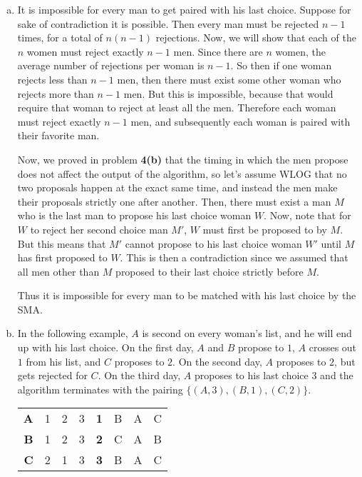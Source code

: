 \begin{enumerate}
\begin{enumerate}[(a)]
        \item It is impossible for every man to get paired with his last choice. Suppose for sake of contradiction it is possible. Then every man must be rejected $n-1$ times, for a total of $n(n-1)$ rejections. Now, we will show that each of the $n$ women must reject exactly $n-1$ men. Since there are $n$ women, the average number of rejections per woman is $n-1$. So then if one woman rejects less than $n-1$ men, then there must exist some other woman who rejects more than $n-1$ men. But this is impossible, because that would require that woman to reject at least all the men. Therefore each woman must reject exactly $n-1$ men, and subsequently each woman is paired with their favorite man.
        
        Now, we proved in problem \textbf{4(b)} that the timing in which the men propose does not affect the output of the algorithm, so let's assume WLOG that no two proposals happen at the exact same time, and instead the men make their proposals strictly one after another. Then, there must exist a man $M$ who is the last man to propose his last choice woman $W$. Now, note that for $W$ to reject her second choice man $M'$, $W$ must first be proposed to by $M$. But this means that $M'$ cannot propose to his last choice woman $W'$ until $M$ has first proposed to $W$. This is then a contradiction since we assumed that all men other than $M$ proposed to their last choice strictly before $M$.
        
        Thus it is impossible for every man to be matched with his last choice by the SMA.
        
        \item In the following example, $A$ is second on every woman's list, and he will end up with his last choice. On the first day, $A$ and $B$ propose to $1$, $A$ crosses out $1$ from his list, and $C$ proposes to $2$. On the second day, $A$ proposes to $2$, but gets rejected for $C$. On the third day, $A$ proposes to his last choice $3$ and the algorithm terminates with the pairing $\{(A,3),(B,1),(C,2)\}$.
        \begin{center}\begin{tabular}{rlll|rlll}
        \textbf{A} & 1 & 2 & 3 & \textbf{1} & B & A & C \\
        \textbf{B} & 1 & 2 & 3 & \textbf{2} & C & A & B \\
        \textbf{C} & 2 & 1 & 3 & \textbf{3} & B & A & C
        \end{tabular}\end{center}
    \end{enumerate}
\end{enumerate}


